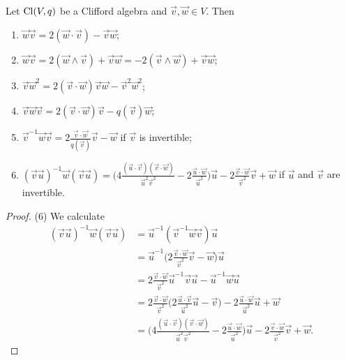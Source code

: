 \begin{lemma} \label{CliffordAlgebraVectorSwap}
Let $\operatorname{Cl}(V,q)$ be a Clifford algebra and $\vec{v},\vec{w}\in V$.
Then
\begin{enumerate}
\item $\vec{w}\vec{v} = 2(\vec{w}\cdot \vec{v}) - \vec{v}\vec{w}$;
\item $\vec{w}\vec{v} = 2(\vec{w}\wedge \vec{v}) + \vec{v}\vec{w} = -2(\vec{v}\wedge \vec{w}) + \vec{v}\vec{w}$;
\item $\vec{v}\vec{w}^2 = 2 (\vec{v}\cdot \vec{w})\vec{v}\vec{w} - \vec{v}^2 \vec{w}^2$;
\item $\vec{v}\vec{w}\vec{v} = 2(\vec{v}\cdot \vec{w})\vec{v} - q(\vec{v})\vec{w}$;
\item $\vec{v}^{-1}\vec{w}\vec{v} = 2\frac{\vec{v}\cdot \vec{w}}{q(\vec{v})}\vec{v} - \vec{w}$ if $\vec{v}$ is invertible;
\item $(\vec{v}\vec{u})^{-1}\vec{w}(\vec{v}\vec{u}) = \big(4 \frac{(\vec{u}\cdot \vec{v})(\vec{v}\cdot \vec{w})}{\vec{u}^2 \vec{v}^2} - 2 \frac{\vec{u}\cdot \vec{w}}{\vec{u}^2}\big)\vec{u} - 2 \frac{\vec{v}\cdot \vec{w}}{\vec{v}^2} \vec{v} + \vec{w}$ if $\vec{u}$ and $\vec{v}$ are invertible.
\end{enumerate}
\end{lemma}
\begin{proof}
(6) We calculate
\begin{align*}
(\vec{v}\vec{u})^{-1}\vec{w}(\vec{v}\vec{u}) &= \vec{u}^{-1}(\vec{v}^{-1}\vec{w}\vec{v})\vec{u} \\
&= \vec{u}^{-1}\big(2 \frac{\vec{v}\cdot \vec{w}}{\vec{v}^2}\vec{v} - \vec{w}\big)\vec{u} \\
&= 2 \frac{\vec{v}\cdot \vec{w}}{\vec{v}^2}\vec{u}^{-1}\vec{v}\vec{u} - \vec{u}^{-1}\vec{w}\vec{u} \\
&= 2 \frac{\vec{v}\cdot \vec{w}}{\vec{v}^2}\Big(2 \frac{\vec{u}\cdot \vec{v}}{\vec{u}^2}\vec{u} - \vec{v}\Big) - 2 \frac{\vec{u}\cdot \vec{w}}{\vec{u}^2}\vec{u} + \vec{w} \\
&= \Big(4 \frac{(\vec{u}\cdot \vec{v})(\vec{v}\cdot \vec{w})}{\vec{u}^2 \vec{v}^2} - 2 \frac{\vec{u}\cdot \vec{w}}{\vec{u}^2}\Big)\vec{u} - 2 \frac{\vec{v}\cdot \vec{w}}{\vec{v}^2} \vec{v} + \vec{w}.
\end{align*}
\end{proof}

